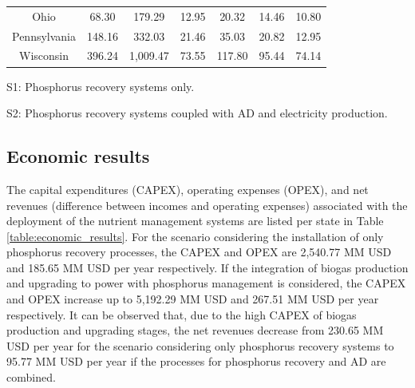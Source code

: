 \begin{refsection}[referencesCh4]
\begin{table}[h]
{\begin{threeparttable}
\begin{tabular}{@{}ccccccc@{}}
				Ohio                   & 68.30                                       & 179.29                                      & 12.95                                         & 20.32                                        & 14.46                                                          & 10.80                                                          \\
				Pennsylvania           & 148.16                                       & 332.03                                      & 21.46                                        & 35.03                                       & 20.82                                                          & 12.95                                                          \\
				Wisconsin              & 396.24                                      & 1,009.47                                      & 73.55                                        & 117.80                                        & 95.44                                                          & 74.14                                                         \\ \bottomrule
			\end{tabular}
			\begin{tablenotes}
				\item S1: Phosphorus recovery systems only.
				\item S2: Phosphorus recovery systems coupled with AD and electricity production.
			\end{tablenotes}
		\end{threeparttable}
	}
\end{table}

\subsection{Economic results}
The capital expenditures (CAPEX), operating expenses (OPEX), and net revenues (difference between incomes and operating expenses) associated with the deployment of the nutrient management systems are listed per state in Table \ref{table:economic_results}. For the scenario considering the installation of only phosphorus recovery processes, the CAPEX and OPEX are 2,540.77 MM USD and 185.65 MM USD per year respectively. If the integration of biogas production and upgrading to power with phosphorus management is considered, the CAPEX and OPEX increase up to 5,192.29 MM USD and 267.51 MM USD per year respectively. It can be observed that, due to the high CAPEX of biogas production and upgrading stages, the net revenues decrease from 230.65 MM USD per year for the scenario considering only phosphorus recovery systems to 95.77 MM USD per year if the processes for phosphorus recovery and AD are combined.


\end{refsection}
